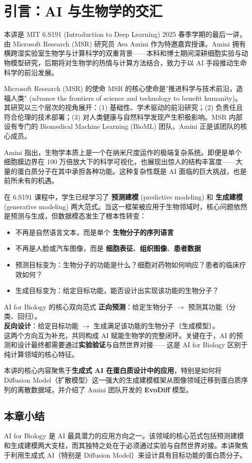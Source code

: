 \section{引言：AI 与生物学的交汇}

本讲是 MIT 6.S191 (Introduction to Deep Learning) 2025 春季学期的最后一讲，由 Microsoft Research (MSR) 研究员 Ava Amini 作为特邀嘉宾授课。Amini 拥有横跨湿实验室生物学与计算科学的双重背景——本科和博士期间深耕细胞实验与动物模型研究，后期将对生物学的热情与计算方法结合，致力于以 AI 手段推动生命科学的前沿发展。

\begin{knowledgebox}{Microsoft Research (MSR) 的使命}
MSR 的核心使命是"推进科学与技术前沿，造福人类" (advance the frontiers of science and technology to benefit humanity)。其研究以三个层次的视角展开：(1) 基础性、学术驱动的前沿研究；(2) 负责任且符合伦理的技术部署；(3) 对人类健康与自然科学发现产生积极影响。MSR 内部设有专门的 Biomedical Machine Learning (BioML) 团队，Amini 正是该团队的核心成员。
\end{knowledgebox}

Amini 指出，生物学本质上是一个在纳米尺度运作的极端复杂系统。即便是单个细胞膜边界在 100 万倍放大下的科学可视化，也展现出惊人的结构丰富度——大量的蛋白质分子在其中承担各种功能。这种复杂性既是 AI 面临的巨大挑战，也是前所未有的机遇。

在 6.S191 课程中，学生已经学习了 \textbf{预测建模} (predictive modeling) 和 \textbf{生成建模} (generative modeling) 两大范式。当这一框架被应用于生物领域时，核心问题依然是预测与生成，但数据模态发生了根本性转变：

\begin{itemize}
    \item 不再是自然语言文本，而是单个 \textbf{生物分子的序列语言}
    \item 不再是人脸或汽车图像，而是 \textbf{细胞表征}、\textbf{组织图像}、\textbf{患者数据}
    \item 预测目标变为：生物分子的功能是什么？细胞对药物如何响应？患者的临床疗效如何？
    \item 生成目标变为：给定目标功能，能否设计出实现该功能的生物分子？
\end{itemize}

\begin{importantbox}{AI for Biology 的核心双向范式}
\textbf{正向预测}：给定生物分子 $\rightarrow$ 预测其功能（分类、回归）。\\
\textbf{反向设计}：给定目标功能 $\rightarrow$ 生成满足该功能的生物分子（生成模型）。\\
这两个方向互为补充，共同构成 AI 赋能生物学的完整闭环。关键在于，AI 的预测和设计最终都需要通过\textbf{实验验证}与自然世界对接——这是 AI for Biology 区别于纯计算领域的核心特征。
\end{importantbox}

本讲的核心内容聚焦于\textbf{生成式 AI 在蛋白质设计中的应用}，特别是如何将 Diffusion Model（扩散模型）这一强大的生成建模框架从图像领域迁移到蛋白质序列的离散数据域，并介绍了 Amini 团队开发的 \textbf{EvoDiff} 模型。

\subsection{本章小结}

AI for Biology 是 AI 最具潜力的应用方向之一。该领域的核心范式包括预测建模和生成建模两大支柱，而其独特之处在于必须通过实验与自然世界对接。本讲聚焦于利用生成式 AI（特别是 Diffusion Model）来设计具有目标功能的蛋白质分子。



